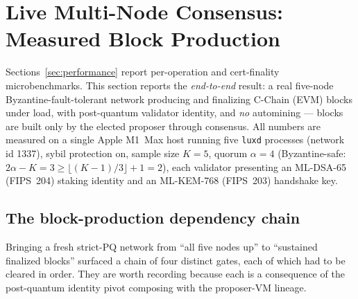 \section{Live Multi-Node Consensus: Measured Block Production}
\label{sec:live-consensus}

Sections~\ref{sec:performance} report per-operation and cert-finality
microbenchmarks. This section reports the \emph{end-to-end} result: a
real five-node Byzantine-fault-tolerant network producing and finalizing
C-Chain (EVM) blocks under load, with post-quantum validator identity,
and \emph{no} automining --- blocks are built only by the elected
proposer through consensus. All numbers are measured on a single Apple
M1~Max host running five \texttt{luxd} processes (network id
\num{1337}), sybil protection on, sample size $K{=}5$, quorum
$\alpha{=}4$ (Byzantine-safe: $2\alpha - K = 3 \ge \lfloor(K{-}1)/3\rfloor
+ 1 = 2$), each validator presenting an ML-DSA-65 (FIPS~204) staking
identity and an ML-KEM-768 (FIPS~203) handshake key.

\subsection{The block-production dependency chain}

Bringing a fresh strict-PQ network from ``all five nodes up'' to
``sustained finalized blocks'' surfaced a chain of four distinct gates,
each of which had to be cleared in order. They are worth recording
because each is a consequence of the post-quantum identity pivot
composing with the proposer-VM lineage.

